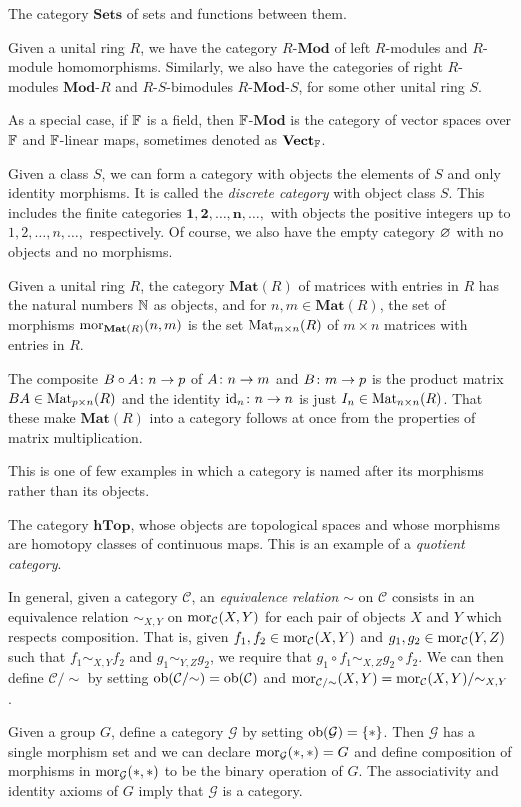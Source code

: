\bs
\ben[label=(\alph*)]
\item 
\ben[label=(\roman*)]
\item The category $\mathbf{Sets}$ of sets and functions between them.
\item Given a unital ring $R$, we have the category $R$-$\mathbf{Mod}$ of left $R$-modules and $R$-module homomorphisms. Similarly, we also have the categories of right $R$-modules $\mathbf{Mod}$-$R$ and $R$-$S$-bimodules $R$-$\mathbf{Mod}$-$S$, for some other unital ring $S$.

As a special case, if $\mathbb{F}$ is a field, then $\mathbb{F}$-$\mathbf{Mod}$ is the category of vector spaces over $\mathbb{F}$ and $\mathbb{F}$-linear maps, sometimes denoted as $\mathbf{Vect}_{\mathbb{F}}$. 
\item Given a class $S$, we can form a category with objects the elements of $S$ and only identity morphisms. It is called the \emph{discrete category} with object class $S$. This includes the finite categories $\mathbf{1}, \mathbf{2},\ldots, \mathbf{n},\ldots,$ with objects the positive integers up to $1,2,\ldots,n,\ldots,$ respectively. Of course, we also have the empty category $\varnothing$ with no objects and no morphisms.  
\item Given a unital ring $R$, the category $\mathbf{Mat}(R)$ of matrices with entries in $R$ has the natural numbers $\mathbb{N}$ as objects, and for $n,m\in \mathbf{Mat}(R)$, the set of morphisms $\operatorname{mor}_{\mathbf{Mat}(R)}(n,m)$ is the set $\mathrm{Mat}_{m\times n}(R)$ of $m\times n$ matrices with entries in $R$.

The composite $B\circ A\colon n\to p$ of $A\colon n\to m$ and $B\colon m\to p$ is the product matrix $BA\in\mathrm{Mat}_{p\times n}(R)$ and the identity $\mathrm{id}_n\colon n\to n$ is just $I_n\in \mathrm{Mat}_{n\times n}(R)$. That these make $\mathbf{Mat}(R)$ into a category follows at once from the properties of matrix multiplication.

This is one of few examples in which a category is named after its morphisms rather than its objects.
\item The category $\mathbf{hTop}$, whose objects are topological spaces and whose morphisms are homotopy classes of continuous maps. This is an example of a \emph{quotient category}.

In general, given a category $\mathcal{C}$, an \emph{equivalence relation} $\sim$ on $\mathcal{C}$ consists in an equivalence relation $\sim_{X,Y}$ on $\operatorname{mor}_{\mathcal{C}}(X,Y)$ for each pair of objects $X$ and $Y$ which respects composition. That is, given $f_1,f_2\in\operatorname{mor}_{\mathcal{C}}(X,Y)$ and $g_1,g_2\in\operatorname{mor}_{\mathcal{C}}(Y,Z)$ such that $f_1\sim_{X,Y}f_2$ and $g_1\sim_{Y,Z}g_2$, we require that $g_1\circ f_1\sim_{X,Z}g_2\circ f_2$. We can then define $\mathcal{C}/{\sim}$ by setting $\operatorname{ob}(\mathcal{C}/{\sim})=\operatorname{ob}(\mathcal{C})$ and $\operatorname{mor}_{\mathcal{C}/{\sim}}(X,Y)=\operatorname{mor}_{\mathcal{C}}(X,Y)/{\sim_{X,Y}}$. 
\een
\item Given a group $G$, define a category $\mathcal{G}$ by setting $\operatorname{ob}(\mathcal{G})=\{*\}$. Then $\mathcal{G}$ has a single morphism set and we can declare $\operatorname{mor}_{\mathcal{G}}(*,*)=G$ and define composition of morphisms in $\operatorname{mor}_{\mathcal{G}}(*,*)$ to be the binary operation of $G$. The associativity and identity axioms of $G$ imply that $\mathcal{G}$ is a category. 

